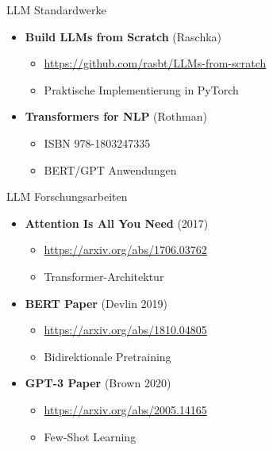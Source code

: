 \documentclass[aspectratio=1610, xcolor=dvipsnames, 9pt]{beamer}
\begin{document}
\begin{frame}{LLM Standardwerke}
\begin{itemize}
\item \textbf{Build LLMs from Scratch} (Raschka)
\begin{itemize}
\item \url{https://github.com/rasbt/LLMs-from-scratch}
\item Praktische Implementierung in PyTorch
\end{itemize}

\item \textbf{Transformers for NLP} (Rothman)
\begin{itemize}
\item ISBN 978-1803247335
\item BERT/GPT Anwendungen
\end{itemize}
\end{itemize}
\end{frame}

\begin{frame}{LLM Forschungsarbeiten}
\begin{itemize}
\item \textbf{Attention Is All You Need} (2017)
\begin{itemize}
\item \url{https://arxiv.org/abs/1706.03762}
\item Transformer-Architektur
\end{itemize}

\item \textbf{BERT Paper} (Devlin 2019)
\begin{itemize}
\item \url{https://arxiv.org/abs/1810.04805}
\item Bidirektionale Pretraining
\end{itemize}

\item \textbf{GPT-3 Paper} (Brown 2020)
\begin{itemize}
\item \url{https://arxiv.org/abs/2005.14165}
\item Few-Shot Learning
\end{itemize}
\end{itemize}
\end{frame}
\end{document}
